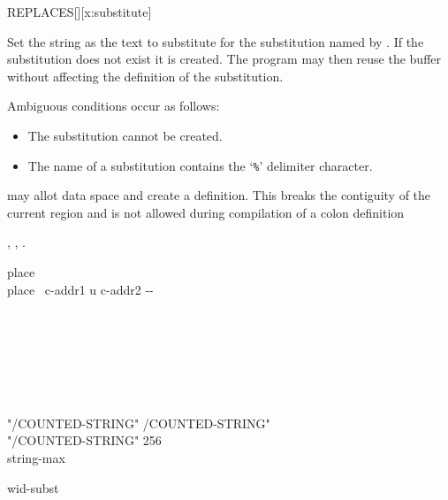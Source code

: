 \begin{worddef*}{}{REPLACES}[][x:substitute]
\item {}

	Set the string  as the text to substitute for
	the substitution named by .
	If the substitution does not exist it is created.
	The program may then reuse the buffer  without
	affecting the definition of the substitution.

	Ambiguous conditions occur as follows:
	\begin{itemize}
	\item The substitution cannot be created.
	\item The name of a substitution contains the `\texttt{\%}' delimiter character.
	\end{itemize}

	 may allot data space and create a definition.  This breaks
	the contiguity of the current region and is not allowed during compilation
	of a colon definition
  
\see {},
	,
	.

	\begin{implement}

		\word[tools]{[UNDEFINED]} place \word[tools]{[IF]} \\
		\tab \word{:} place \tab {} \ c-addr1 u c-addr2 -{}- \\
		\tab {}  \\
		\tab {}  \\
		\tab[2]   \\
		  \word{+}   \\
		\tab[2]   \\
		\tab \word{;} \\
		\word[tools]{[THEN]}

		\word{:} "/COUNTED-STRING"  /COUNTED-STRING" \word{;} \\
		"/COUNTED-STRING"   \word[tools]{[IF]} 256 \word[tools]{[THEN]} \\
		  string-max

		  wid-subst \\
		 


\end{implement}
\end{worddef*}

